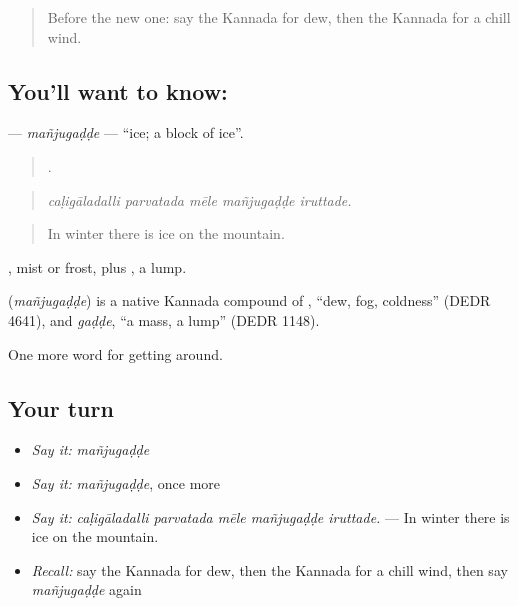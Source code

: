 \label{lesson:KA-C489-manjugadde}



\begin{quote}
Before the new one: say the Kannada for dew, then the Kannada for a chill wind.
\end{quote}

\subsection*{You'll want to know: }
\textbf{} — \emph{mañjugaḍḍe} — \textquotedblleft{}ice; a block of ice\textquotedblright{}.

\begin{quote}
    .
\end{quote}

\begin{quote}
\emph{caḷigāladalli parvatada mēle mañjugaḍḍe iruttade.}
\end{quote}

\begin{quote}
In winter there is ice on the mountain.
\end{quote}

, mist or frost, plus , a lump.

\begin{cousinweb}
\textbf{} (\emph{mañjugaḍḍe}) is a native Kannada compound of , \textquotedblleft{}dew, fog, coldness\textquotedblright{} (DEDR 4641), and \emph{gaḍḍe}, \textquotedblleft{}a mass, a lump\textquotedblright{} (DEDR 1148).
\end{cousinweb}

\begin{grammarlens}[title={What you've built}]
One more word for getting around.
\end{grammarlens}

\subsection*{Your turn}
\begin{itemize}
\raggedright
  \item \emph{Say it:} \emph{mañjugaḍḍe}
  \item \emph{Say it:} \emph{mañjugaḍḍe}, once more
  \item \emph{Say it:} \emph{caḷigāladalli parvatada mēle mañjugaḍḍe iruttade.} — In winter there is ice on the mountain.
  \item \emph{Recall:} say the Kannada for dew, then the Kannada for a chill wind, then say \emph{mañjugaḍḍe} again
\end{itemize}

